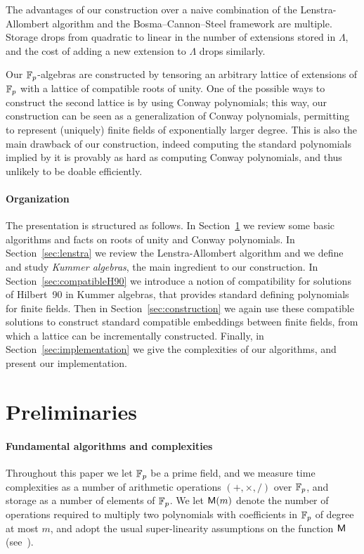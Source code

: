 \documentclass{sig-alternate}
\begin{document}
The advantages of our construction over a naive combination of the
Lenstra-Allombert algorithm and the Bosma--Cannon--Steel framework are
multiple. %
Storage drops from quadratic to linear in the number of extensions
stored in $\Lambda$, and the cost of adding a new extension to
$\Lambda$ drops similarly. %

Our $\mathbb{F}_{p}$-algebras are constructed by tensoring an arbitrary
lattice of extensions of $\mathbb{F}_{p}$ with a lattice of compatible roots
of unity. %
One of the possible ways to construct the second lattice is by using
Conway polynomials; this way, our construction can be seen as a
generalization of Conway polynomials, permitting to represent
(uniquely) finite fields of exponentially larger degree. %
This is also the main drawback of our construction, indeed computing
the standard polynomials implied by it is provably as hard as
computing Conway polynomials, and thus unlikely to be doable
efficiently.


\paragraph{Organization}
The presentation is structured as follows. %
In Section~\ref{sec:conway} we review some basic algorithms and facts
on roots of unity and Conway polynomials. %
In Section~\ref{sec:lenstra} we review the Lenstra-Allombert algorithm
and we define and study \emph{Kummer algebras}, the main ingredient to
our construction. %
In Section~\ref{sec:compatibleH90} we introduce a notion of
compatibility for solutions of Hilbert~90 in Kummer algebras, that
provides standard defining polynomials for finite fields.  Then in
Section~\ref{sec:construction} we again use these compatible solutions
to construct standard compatible embeddings between finite fields,
from which a lattice can be incrementally constructed.  Finally, in
Section~\ref{sec:implementation} we give the complexities of our
algorithms, and present our implementation.


\section{Preliminaries}
\label{sec:conway}

\paragraph{Fundamental algorithms and complexities}
Throughout this paper we let $\mathbb{F}_p$ be a prime field, and we measure
time complexities as a number of arithmetic operations $(+,\times,/)$
over $\mathbb{F}_p$, and storage as a number of elements of $\mathbb{F}_p$. %
We let $\mathsf{M}(m)$ denote the number of operations required to multiply
two polynomials with coefficients in $\mathbb{F}_p$ of degree at most $m$, and
adopt the usual super-linearity assumptions on the function $\mathsf{M}$
(see~\cite[Ch.~8.3]{vzGG}).
\end{document}
